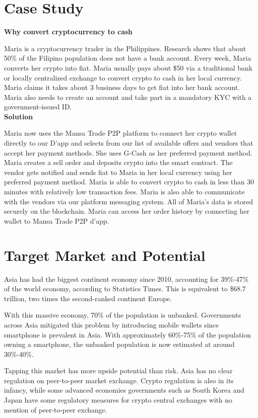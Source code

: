 \documentclass{article}
\begin{document}
\section{Case Study}

\textbf{Why convert cryptocurrency to cash}

Maria is a cryptocurrency trader in the Philippines. Research shows that about 50\% of the Filipino population does not have a bank account. Every week, Maria converts her crypto into fiat. Maria usually pays about \$50 via a traditional bank or locally centralized exchange to convert crypto to cash in her local currency. Maria claims it takes about 3 business days to get fiat into her bank account. Maria also needs to create an account and take part in a mandatory KYC with a government-issued ID.\\

\textbf{Solution}

Maria now uses the Mansa Trade P2P platform to connect her crypto wallet directly to our D’app and selects from our list of available offers and vendors that accept her payment methods. She uses G-Cash as her preferred payment method. Maria creates a sell order and deposits crypto into the smart contract. The vendor gets notified and sends fiat to Maria in her local currency using her preferred payment method. Maria is able to convert crypto to cash in less than 30 minutes with relatively low transaction fees. Maria is also able to communicate with the vendors via our platform messaging system. All of Maria’s data is stored securely on the blockchain. Maria can access her order history by connecting her wallet to Mansa Trade P2P d’app.

\section{Target Market and Potential}

Asia has had the biggest continent economy since 2010, accounting for 39\%-47\% of the world economy, according to Statistics Times. This is equivalent to \$68.7 trillion, two times the second-ranked continent Europe.

With this massive economy, 70\% of the population is unbanked. Governments across Asia mitigated this problem by introducing mobile wallets since smartphone is prevalent in Asia. With approximately 60\%-75\% of the population owning a smartphone, the unbanked population is now estimated at around 30\%-40\%.

Tapping this market has more upside potential than risk. Asia has no clear regulation on peer-to-peer market exchange. Crypto regulation is also in its infancy, while some advanced economies governments such as South Korea and Japan have some regulatory measures for crypto central exchanges with no mention of peer-to-peer exchange. 
\end{document}
